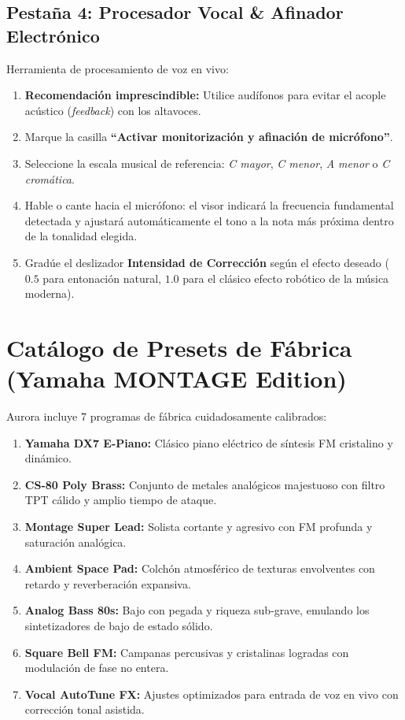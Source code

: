\documentclass[11pt,a4paper]{article}
\begin{document}
\subsection{Pestaña 4: Procesador Vocal \& Afinador Electrónico}
Herramienta de procesamiento de voz en vivo:
\begin{enumerate}[leftmargin=1.5cm]
    \item \textbf{Recomendación imprescindible:} Utilice audífonos para evitar el acople acústico (\textit{feedback}) con los altavoces.
    \item Marque la casilla \textbf{``Activar monitorización y afinación de micrófono''}.
    \item Seleccione la escala musical de referencia: \textit{C mayor}, \textit{C menor}, \textit{A menor} o \textit{C cromática}.
    \item Hable o cante hacia el micrófono: el visor indicará la frecuencia fundamental detectada y ajustará automáticamente el tono a la nota más próxima dentro de la tonalidad elegida.
    \item Gradúe el deslizador \textbf{Intensidad de Corrección} según el efecto deseado ($0.5$ para entonación natural, $1.0$ para el clásico efecto robótico de la música moderna).
\end{enumerate}

\section{Catálogo de Presets de Fábrica (Yamaha MONTAGE Edition)}

Aurora incluye 7 programas de fábrica cuidadosamente calibrados:
\begin{enumerate}[leftmargin=1.5cm]
    \item \textbf{Yamaha DX7 E-Piano:} Clásico piano eléctrico de síntesis FM cristalino y dinámico.
    \item \textbf{CS-80 Poly Brass:} Conjunto de metales analógicos majestuoso con filtro TPT cálido y amplio tiempo de ataque.
    \item \textbf{Montage Super Lead:} Solista cortante y agresivo con FM profunda y saturación analógica.
    \item \textbf{Ambient Space Pad:} Colchón atmosférico de texturas envolventes con retardo y reverberación expansiva.
    \item \textbf{Analog Bass 80s:} Bajo con pegada y riqueza sub-grave, emulando los sintetizadores de bajo de estado sólido.
    \item \textbf{Square Bell FM:} Campanas percusivas y cristalinas logradas con modulación de fase no entera.
    \item \textbf{Vocal AutoTune FX:} Ajustes optimizados para entrada de voz en vivo con corrección tonal asistida.
\end{enumerate}
\end{document}
